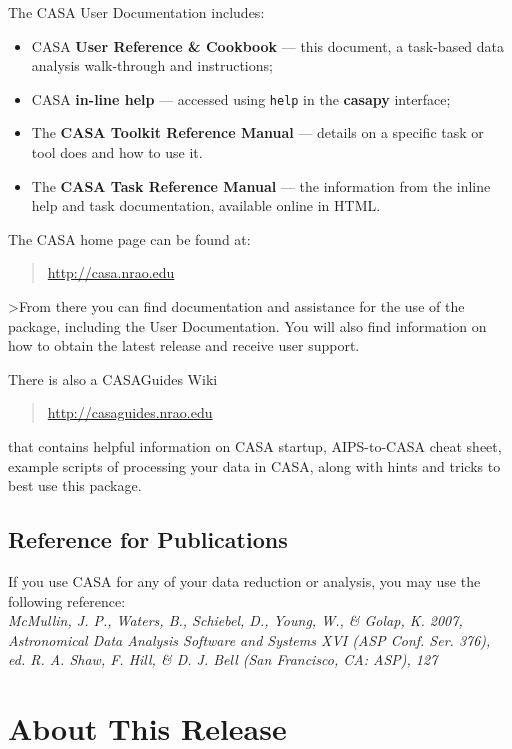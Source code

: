 The CASA User Documentation includes:
\begin{itemize}
   \item CASA {\bf User Reference \& Cookbook} --- this
     document, a task-based data analysis walk-through and instructions;
   \item CASA {\bf in-line help} --- accessed using {\tt help} in the 
              {\bf casapy} interface;
   \item The {\bf CASA Toolkit Reference Manual} --- 
         details on a specific task or tool does and how to use it.
   \item The {\bf CASA Task Reference Manual} --- 
         the information from the inline help and task documentation,
         available online in HTML.
\end{itemize}

The CASA home page can be found at:
\begin{quote}
  \url{http://casa.nrao.edu}
\end{quote}
>From there you can find documentation and assistance for the use
of the package, including the User Documentation.  You will
also find information on how to obtain the latest release and
receive user support.

There is also a CASAGuides Wiki
\begin{quote}
   \url{http://casaguides.nrao.edu}
\end{quote}
that contains helpful information on CASA startup, AIPS-to-CASA
cheat sheet, example scripts of processing your data in CASA,
along with hints and tricks to best use this package.

\subsection{Reference for Publications}

If you use CASA for any of your data reduction or analysis, you may
use the following reference:\\

{\it McMullin, J. P., Waters, B., Schiebel, D., Young, W., \& Golap, K. 2007, Astronomical Data Analysis Software and Systems XVI (ASP Conf. Ser. 376), ed. R. A. Shaw, F. Hill, \& D. J. Bell (San Francisco, CA: ASP), 127}




\section{About This Release}
\label{section:intro.release}

